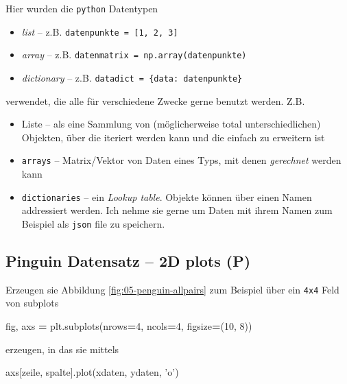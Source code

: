 \documentclass[]{book}
\newenvironment{Shaded}{\begin{snugshade}}{\end{snugshade}}
\newcommand{\DecValTok}[1]{\textcolor[rgb]{0.00,0.00,0.81}{#1}}
\newcommand{\NormalTok}[1]{#1}
\newcommand{\OperatorTok}[1]{\textcolor[rgb]{0.81,0.36,0.00}{\textbf{#1}}}
\newcommand{\StringTok}[1]{\textcolor[rgb]{0.31,0.60,0.02}{#1}}
\providecommand{\tightlist}{%
  \setlength{\itemsep}{0pt}\setlength{\parskip}{0pt}}
\theoremstyle{definition}
\theoremstyle{definition}
\theoremstyle{definition}
\theoremstyle{definition}
\theoremstyle{remark}
\begin{document}
Hier wurden die \texttt{python} Datentypen

\begin{itemize}
\tightlist
\item
  \emph{list} -- z.B. \texttt{datenpunkte\ =\ {[}1,\ 2,\ 3{]}}
\item
  \emph{array} -- z.B. \texttt{datenmatrix\ =\ np.array(datenpunkte)}
\item
  \emph{dictionary} -- z.B. \texttt{datadict\ =\ \{\textquotesingle{}data\textquotesingle{}:\ datenpunkte\}}
\end{itemize}

verwendet, die alle für verschiedene Zwecke gerne benutzt werden. Z.B.

\begin{itemize}
\tightlist
\item
  Liste -- als eine Sammlung von (möglicherweise total unterschiedlichen) Objekten, über die iteriert werden kann und die einfach zu erweitern ist
\item
  \texttt{arrays} -- Matrix/Vektor von Daten eines Typs, mit denen \emph{gerechnet} werden kann
\item
  \texttt{dictionaries} -- ein \emph{Lookup table}. Objekte können über einen Namen addressiert werden. Ich nehme sie gerne um Daten mit ihrem Namen zum Beispiel als \texttt{json} file zu speichern.
\end{itemize}

\hypertarget{pinguin-datensatz-2d-plots-p}{%
\subsection{Pinguin Datensatz -- 2D plots (P)}\label{pinguin-datensatz-2d-plots-p}}

Erzeugen sie Abbildung \ref{fig:05-penguin-allpairs} zum Beispiel über ein \texttt{4x4} Feld von subplots

\begin{Shaded}
\begin{Highlighting}[]
\NormalTok{fig, axs }\OperatorTok{=}\NormalTok{ plt.subplots(nrows}\OperatorTok{=}\DecValTok{4}\NormalTok{, ncols}\OperatorTok{=}\DecValTok{4}\NormalTok{, figsize}\OperatorTok{=}\NormalTok{(}\DecValTok{10}\NormalTok{, }\DecValTok{8}\NormalTok{))}
\end{Highlighting}
\end{Shaded}

erzeugen, in das sie mittels

\begin{Shaded}
\begin{Highlighting}[]
\NormalTok{axs[zeile, spalte].plot(xdaten, ydaten, }\StringTok{'o'}\NormalTok{)}
\end{Highlighting}
\end{Shaded}
\end{document}
